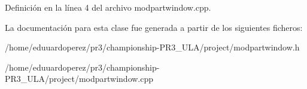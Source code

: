 Definición en la línea 4 del archivo modpartwindow.\+cpp.



La documentación para esta clase fue generada a partir de los siguientes ficheros\+:\begin{DoxyCompactItemize}
\item 
/home/eduuardoperez/pr3/championship-\/\+P\+R3\+\_\+\+U\+L\+A/project/modpartwindow.\+h\item 
/home/eduuardoperez/pr3/championship-\/\+P\+R3\+\_\+\+U\+L\+A/project/modpartwindow.\+cpp\end{DoxyCompactItemize}
